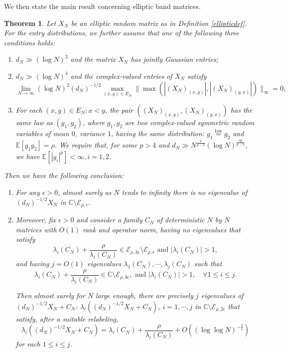 \documentclass[11pt,reqno]{amsart}
\theoremstyle{plain}
\newtheorem{theorem}{Theorem}[section]
\theoremstyle{remark}
\numberwithin{equation}{section}
\begin{document}
We then state the main result concerning elliptic band matrices.
\begin{theorem}\label{TheEllipticTheorem} Let $X_N$ be an elliptic random matrix as in Definition \ref{ellipticdef}.
For the entry distributions, we further assume that  one of the following three conditions holds: \begin{enumerate}
    \item   $d_N\gg(\log N)^3$ and the matrix $X_N$ has jointly Gaussian entries;  \item  $d_N\gg(\log N)^4$ and the complex-valued entries of $X_N$ satisfy $$\lim_{N\to\infty} (\log N)^2 (d_N)^{-1/2}\max_{(x,y)\in E_N}{\|\max(|(X_N)_{(x,y)}|,|(X_N)_{(y,x)}|)\|_\infty}=0;$$ \item For each $(x,y)\in E_N:x<y$, the pair $((X_N)_{(x,y)},(X_N)_{(y,x)})$ has the same law as $(g_1,g_2)$, where $g_1,g_2$ are two complex-valued symmetric random variables of mean $0$, variance $1$, having the same distribution: $g_1\stackrel{\text{law}}{=}g_2$ and $\mathbb{E}[g_1g_2]=\rho$. We require that, for some $p>4$ and $d_N\gg N^\frac{2}{p-2}(\log N)^{\frac{4p}{p-2}}$, we have $\mathbb{E}[|g_i|^p]<\infty,i=1,2$.
\end{enumerate}
Then we have the following conclusion: \begin{enumerate}
    \item For any $\epsilon>0$, almost surely as $N$ tends to infinity there is no eigenvalue of $(d_N)^{-1/2}X_N$ in $\mathbb{C}\setminus\mathcal{E}_{\rho,\epsilon}$.

\item Moreover, fix $\epsilon>0$ and consider a family $C_N$ of deterministic $N$ by $N$ matrices with $O(1)$ rank and operator norm, having no eigenvalues that satisfy 
$$
\lambda_i(C_N)+\frac{\rho}{\lambda_i(C_N)}\in\mathcal{E}_{\rho,3\epsilon}\setminus\mathcal{E}_{\rho,\epsilon}\text{ and } |\lambda_i(C_N)|>1,
$$
and having $j=O(1)$ eigenvalues $\lambda_1(C_N),\cdots,\lambda_j(C_N)$ such that $$\lambda_i(C_N)+\frac{\rho}{\lambda_i(C_N)}\in\mathbb{C}\setminus\mathcal{E}_{\rho,3\epsilon},\text{ and }|\lambda_i(C_N)|> 1,\quad\forall 1\leq i\leq j.$$ 

Then almost surely for $N$ large enough, there are precisely $j$ eigenvalues of $(d_N)^{-1/2}X_N+C_N$: $\lambda_i((d_N)^{-1/2}X_N+C_N)$, $i=1,\cdots,j$ in $\mathbb{C}\setminus\mathcal{E}_{\rho,2\epsilon}$ that satisfy, after a suitable relabeling, $$\lambda_i((d_N)^{-1/2}X_N+C_N)=\lambda_i(C_N)+\frac{\rho}{\lambda_i(C_N)}+O((\log\log N)^{-\frac{3}{4}})$$ for each $1\leq i\leq j$.
\end{enumerate}


\end{theorem}
\end{document}
